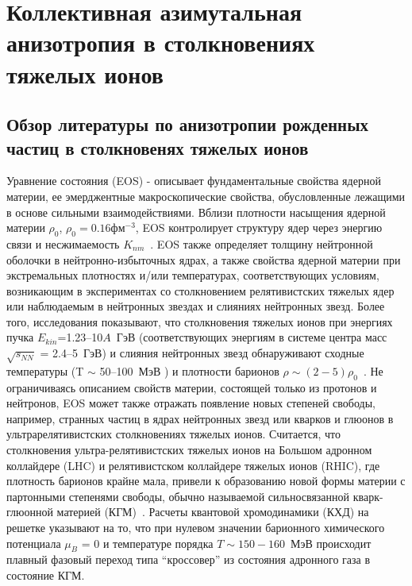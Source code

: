 \chapter{Коллективная азимутальная анизотропия в столкновениях тяжелых ионов} \label{chapt1}

\section{Обзор литературы по анизотропии рожденных частиц в столкновенях тяжелых ионов}

Уравнение состояния (EOS) - описывает фундаментальные свойства ядерной материи, ее эмерджентные макроскопические свойства, обусловленные лежащими в основе сильными взаимодействиями.  
Вблизи плотности насыщения ядерной материи $\rho_{0}$, $\rho_{0}=0.16 фм^{-3}$,  EOS контролирует структуру ядер через энергию связи и несжимаемость $K_{nm}$~\cite{Danielewicz:2002pu}.
EOS также определяет толщину нейтронной оболочки в нейтронно-избыточных ядрах, а также свойства ядерной материи при экстремальных плотностях и/или температурах, соответствующих условиям, возникающим в экспериментах со столкновением релятивистских тяжелых ядер или наблюдаемым в нейтронных звездах  и слияниях нейтронных звезд. 
Более того, исследования показывают, что столкновения тяжелых ионов при энергиях пучка  $E_{kin}$=1.23--10$A$~ГэВ (соответствующих энергиям в системе центра масс $\sqrt{s_{NN}}$ = 2.4--5~ГэВ)  и слияния нейтронных звезд обнаруживают сходные температуры (T $\sim$  50--100~МэВ ) и плотности барионов $\rho \sim (2-5)\rho_{0}$~\cite{Bzdak:2019pkr,Xu:2022mqn}.
Не ограничиваясь описанием свойств материи, состоящей только из протонов и нейтронов, EOS может также отражать появление новых степеней свободы, например, странных частиц в ядрах нейтронных звезд или кварков и глюонов в ультрарелятивистских столкновениях тяжелых ионов. 
Считается, что столкновения ультра-релятивистских тяжелых ионов на Большом адронном коллайдере (LHC) и релятивистском коллайдере тяжелых ионов (RHIC), где  плотность барионов крайне мала, привели к образованию новой формы материи с партонными степенями свободы, обычно называемой сильносвязанной кварк-глюонной материей (КГМ)~\cite{Esumi:2022uas}.
Расчеты квантовой хромодинамики  (КХД) на решетке указывают на то, что при нулевом значении барионного химического потенциала $\mu_{B}$ = 0 и температуре порядка $T \sim  150-160$~МэВ происходит плавный  фазовый переход типа ``кроссовер'' из состояния адронного газа в состояние КГМ. 

